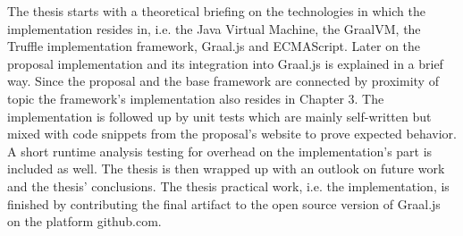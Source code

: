 The thesis starts with a theoretical briefing on the technologies in which the implementation resides in, i.e. the Java Virtual Machine, the GraalVM, the Truffle implementation framework, Graal.js and ECMAScript. Later on the proposal implementation and its integration into Graal.js is explained in a brief way. Since the proposal and the base framework are connected by proximity of topic the framework's implementation also resides in Chapter 3. The implementation is followed up by unit tests which are mainly self-written but mixed with code snippets from the proposal's website to prove expected behavior. A short runtime analysis testing for overhead on the implementation's part is included as well. The thesis is then wrapped up with an outlook on future work and the thesis' conclusions. The thesis practical work, i.e. the implementation, is finished by contributing the final artifact to the open source version of Graal.js on the platform github.com.
\pagebreak
